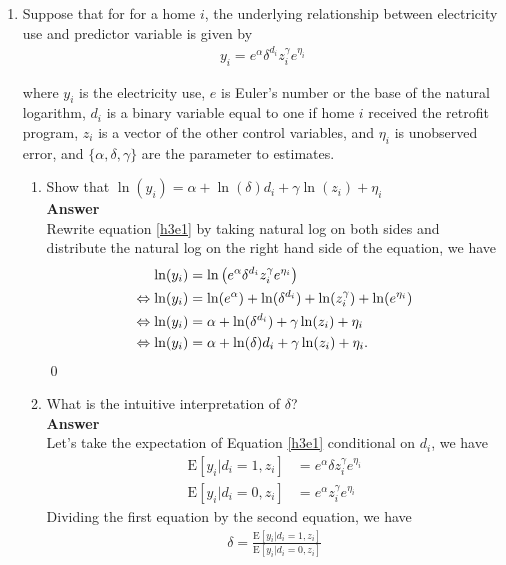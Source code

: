 \documentclass{article}
\newcommand{\E}{\text{E}}
\begin{document}
\begin{enumerate}
\item Suppose that for for a home $i$, the underlying relationship between electricity use and predictor variable is given by 
\begin{align}
    y_i=e^\alpha\delta^{d_i}z_i^{\gamma}e^{\eta_i} \label{h3e1}
\end{align}

where $y_i$ is the electricity use, $e$ is Euler's number or the base of the natural logarithm, $d_i$ is a binary variable equal to one if home $i$ received the retrofit program, $z_i$ is a vector of the other control variables, and $\eta_i$ is unobserved error, and $\{\alpha,\delta,\gamma\}$ are the parameter to estimates.

\begin{enumerate}
    \item Show that $\ln(y_i)=\alpha+\ln(\delta)d_i+\gamma\ln(z_i)+\eta_i$
    \\\textbf{Answer}\\
    Rewrite equation \eqref{h3e1} by taking natural log on both sides and distribute the natural log on the right hand side of the equation, we have
    \begin{align}
         \ln(y_i)&=\ln\left(e^\alpha\delta^{d_i}z_i^{\gamma}e^{\eta_i}\right) \notag\\
        \Leftrightarrow\ln(y_i)&=\ln(e^\alpha)+\ln(\delta^{d_i})+\ln(z_i^{\gamma})+\ln(e^{\eta_i}) \notag\\
        \Leftrightarrow\ln(y_i)&=\alpha+\ln(\delta^{d_i})+\gamma\ln(z_i)+\eta_i \notag\\
        \Leftrightarrow\ln(y_i)&=\alpha+\ln(\delta)d_i+\gamma\ln(z_i)+\eta_i\label{h3e2}.
    \end{align}\qed
    \item What is the intuitive interpretation of $\delta$?
    \\\textbf{Answer}\\
    Let's take the expectation of Equation \eqref{h3e1} conditional on $d_i$, we have
    \begin{align}
        \E[y_i|d_i=1,z_i]&=e^\alpha\delta z_i^{\gamma}e^{\eta_i}\\
        \E[y_i|d_i=0,z_i]&=e^\alpha z_i^{\gamma}e^{\eta_i}
    \end{align}
    Dividing the first equation by the second equation, we have
    \begin{align}
        \delta=\frac{\E[y_i|d_i=1,z_i]}{\E[y_i|d_i=0,z_i]} \label{h3e5} 

\end{align}
\end{enumerate}
\end{enumerate}
\end{document}
